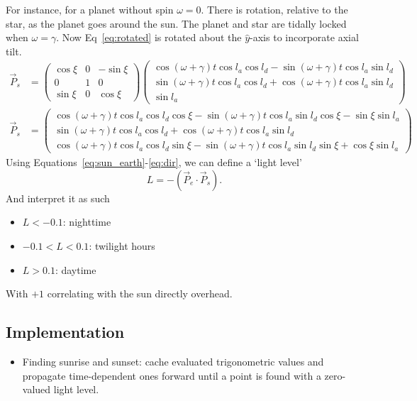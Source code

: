 \documentclass[12pt,a4paper]{article}
\begin{document}
For instance, for a planet without spin \(\omega = 0\). There is rotation, relative to the star, as the planet goes around the sun. The planet and star are tidally locked when \(\omega=\gamma\). Now Eq~\eqref{eq:rotated} is rotated about the \(\hat{y}\)-axis to incorporate axial tilt. 
\begin{align}
\vec{P}_{s} &= \left(\begin{array}{ccc}\cos\xi  & 0 & -\sin\xi \\ 0 & 1 & 0 \\ \sin\xi & 0 & \cos\xi \end{array}\right)\left(\begin{array}{c} \cos(\omega+\gamma)t\cos l_{a}\cos l_{d} - \sin(\omega+\gamma)t\cos l_{a}\sin l_{d} \\ \sin(\omega + \gamma)t\cos l_{a}\cos l_{d} + \cos(\omega+\gamma)t\cos l_{a}\sin l_{d} \\ \sin l_{a} \end{array}\right) \\
\vec{P}_{s} &= \left(\begin{array}{c} \cos(\omega+\gamma)t\cos l_{a}\cos l_{d}\cos\xi - \sin(\omega+\gamma)t\cos l_{a}\sin l_{d}\cos\xi -\sin\xi\sin l_{a} \\ \sin(\omega + \gamma)t\cos l_{a}\cos l_{d} + \cos(\omega+\gamma)t\cos l_{a}\sin l_{d} \\ \cos(\omega+\gamma)t\cos l_{a}\cos l_{d}\sin\xi - \sin(\omega+\gamma)t\cos l_{a}\sin l_{d}\sin\xi + \cos\xi\sin l_{a} \end{array}\right) \label{eq:dir}
\end{align}
Using Equations~\eqref{eq:sun_earth}-\eqref{eq:dir}, we can define a `light level'
\begin{equation}
L = -(\vec{P}_{e}\cdot \vec{P}_{s}).
\end{equation}
And interpret it as such
\begin{itemize}
	\item \(L < -0.1\): nighttime
	\item \(-0.1 < L < 0.1\): twilight hours
	\item \(L>0.1\): daytime 
\end{itemize}
With \(+1\) correlating with the sun directly overhead. 

\subsection{Implementation}
\begin{itemize}
	\item Finding sunrise and sunset: cache evaluated trigonometric values and propagate time-dependent ones forward until a point is found with a zero-valued light level. 
\end{itemize}
\end{document}
